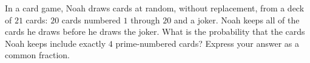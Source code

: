In a card game, Noah draws cards at random, without replacement, from a deck of $21$ cards: $20$ cards numbered $1$ through $20$ and a joker. Noah keeps all of the cards he draws before he draws the joker. What is the probability that the cards Noah keeps include exactly $4$ prime-numbered cards? Express your answer as a common fraction.
